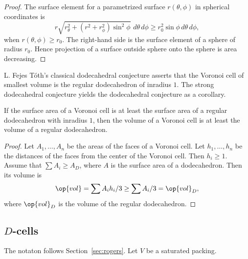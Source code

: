 \begin{proof} The surface element for a parametrized surface $r(\theta,\phi)$ in
spherical coordinates is
\begin{displaymath}
%
r \sqrt{r_\theta^2 + (r^2 + r_\phi^2)\sin^2\phi } \,\,d\theta\,d\phi \ge r_0^2 \sin\phi\, d\theta\,d\phi,
\end{displaymath}
when $r(\theta,\phi)\ge r_0$.
The right-hand side is the surface element of a sphere of radius $r_0$.
Hence projection of a surface outside sphere onto the sphere is area decreasing.
\end{proof}


L. Fejes T\'oth's classical
dodecahedral conjecture asserts that the Voronoi cell of smallest
volume is the regular dodecahedron of inradius $1$.
%
%
The strong dodecahedral conjecture yields the dodecahedral conjecture as a corollary.

\begin{lemma}[]
If the surface area of a Voronoi cell is at least the surface area of a regular dodecahedron with
inradius $1$,
then the volume of a Voronoi cell is at least the volume of a regular dodecahedron.
\end{lemma}

\begin{proof} Let $A_1,\ldots,A_n$ be the areas of the faces of a
  Voronoi cell.  Let $h_1,\ldots,h_n$ be the distances of the faces
  from the center of the Voronoi cell.  Then $h_i\ge 1$.  Assume that
  $\sum A_i \ge A_D$, where $A$ is the surface area of a dodecahedron.
  Then its volume is
\begin{displaymath}
\op{vol} = \sum A_i h_i/3 \ge \sum A_i/3 = \op{vol}_D,
\end{displaymath}
where $\op{vol}_D$ is the volume of the regular dodecahedron.
\end{proof}
%
%
%


\subsection{$D$-cells}



The
notaton follows Section~\ref{sec:rogers}.  Let $V$ be a saturated packing.

